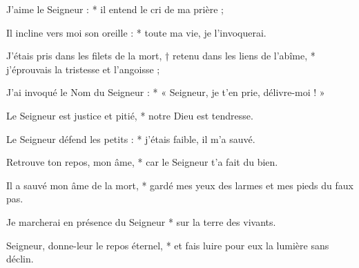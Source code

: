 \item J'aime le Seigneur : * il entend le cri de ma prière ;

\item Il incline vers moi son oreille : * toute ma vie, je l'invoquerai.

\item J'étais pris dans les filets de la mort, † retenu dans les liens de l'abîme, * j'éprouvais la tristesse et l'angoisse ;

\item J'ai invoqué le Nom du Seigneur : * « Seigneur, je t'en prie, délivre-moi ! »

\item Le Seigneur est justice et pitié, * notre Dieu est tendresse.

\item Le Seigneur défend les petits : * j'étais faible, il m'a sauvé.

\item Retrouve ton repos, mon âme, * car le Seigneur t'a fait du bien.

\item Il a sauvé mon âme de la mort, * gardé mes yeux des larmes et mes pieds du faux pas.

\item Je marcherai en présence du Seigneur * sur la terre des vivants.

\item Seigneur, donne-leur le repos éternel, * et fais luire pour eux la lumière sans déclin.